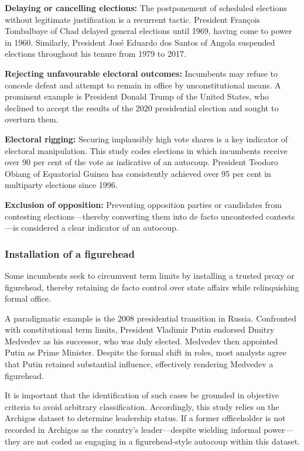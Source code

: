 \documentclass[
  12pt,
]{report}
\begin{document}
\textbf{Delaying or cancelling elections:} The postponement of scheduled
elections without legitimate justification is a recurrent tactic.
President François Tombalbaye of Chad delayed general elections until
1969, having come to power in 1960. Similarly, President José Eduardo
dos Santos of Angola suspended elections throughout his tenure from 1979
to 2017.

\textbf{Rejecting unfavourable electoral outcomes:} Incumbents may
refuse to concede defeat and attempt to remain in office by
unconstitutional means. A prominent example is President Donald Trump of
the United States, who declined to accept the results of the 2020
presidential election and sought to overturn them.

\textbf{Electoral rigging:} Securing implausibly high vote shares is a
key indicator of electoral manipulation. This study codes elections in
which incumbents receive over 90 per cent of the vote as indicative of
an autocoup. President Teodoro Obiang of Equatorial Guinea has
consistently achieved over 95 per cent in multiparty elections since
1996.

\textbf{Exclusion of opposition:} Preventing opposition parties or
candidates from contesting elections---thereby converting them into de
facto uncontested contests---is considered a clear indicator of an
autocoup.

\subsubsection*{Installation of a
figurehead}\label{installation-of-a-figurehead}

Some incumbents seek to circumvent term limits by installing a trusted
proxy or figurehead, thereby retaining de facto control over state
affairs while relinquishing formal office.

A paradigmatic example is the 2008 presidential transition in Russia.
Confronted with constitutional term limits, President Vladimir Putin
endorsed Dmitry Medvedev as his successor, who was duly elected.
Medvedev then appointed Putin as Prime Minister. Despite the formal
shift in roles, most analysts agree that Putin retained substantial
influence, effectively rendering Medvedev a figurehead.

It is important that the identification of such cases be grounded in
objective criteria to avoid arbitrary classification. Accordingly, this
study relies on the Archigos dataset to determine leadership status. If
a former officeholder is not recorded in Archigos as the country's
leader---despite wielding informal power---they are not coded as
engaging in a figurehead-style autocoup within this dataset.
\end{document}
